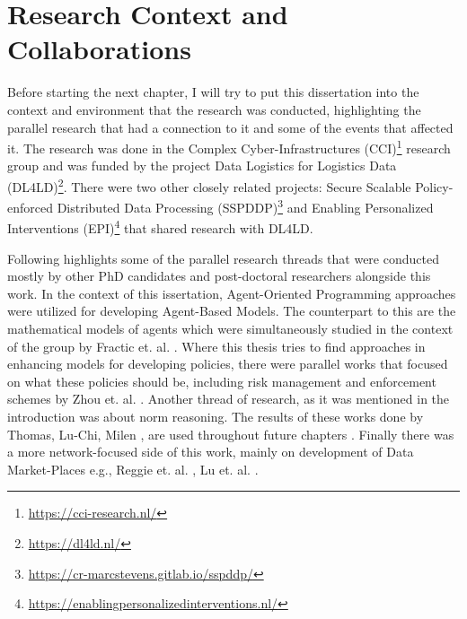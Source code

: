 \section{Research Context and Collaborations}
Before starting the next chapter, I will try to put this dissertation into the context and environment that the research was conducted, highlighting the parallel research that had a connection to it and some of the events that affected it. The research was done in the Complex Cyber-Infrastructures (CCI)\footnote{\url{https://cci-research.nl/}} research group and was funded by the project Data Logistics for Logistics Data (DL4LD)\footnote{\url{https://dl4ld.nl/}}. There were two other closely related projects: Secure Scalable Policy-enforced Distributed Data Processing (SSPDDP)\footnote{\url{https://cr-marcstevens.gitlab.io/sspddp/}} and Enabling Personalized Interventions (EPI)\footnote{\url{https://enablingpersonalizedinterventions.nl/}} that shared research with DL4LD.

Following highlights some of the parallel research threads that were conducted mostly by other PhD candidates and post-doctoral researchers alongside this work. In the context of this issertation, Agent-Oriented Programming approaches were utilized for developing Agent-Based Models. The counterpart to this are the mathematical models of agents which were simultaneously studied in the context of the group by Fractic et. al. \cite{Peter}. Where this thesis tries to find approaches in enhancing models for developing policies, there were parallel works that focused on what these policies should be, including risk management and enforcement schemes by Zhou et. al. \cite{Xin}. Another thread of research, as it was mentioned in the introduction was about norm reasoning. The results of these works done by Thomas, Lu-Chi, Milen \cite{Thomas,Milen,Lu-Chi}, are used throughout future chapters . Finally there was a more network-focused side of this work, mainly on development of Data Market-Places e.g., Reggie et. al. \cite{Reggie}, Lu et. al. \cite{Lu}.

